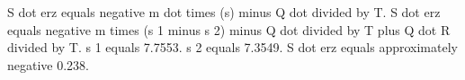 S dot erz equals negative m dot times (s) minus Q dot divided by T.  
S dot erz equals negative m times (s 1 minus s 2) minus Q dot divided by T plus Q dot R divided by T.  
s 1 equals 7.7553.  
s 2 equals 7.3549.  
S dot erz equals approximately negative 0.238.